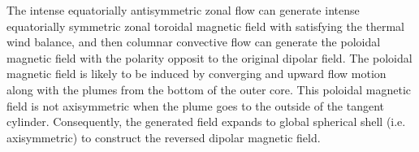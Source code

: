 {The intense equatorially antisymmetric zonal flow can generate intense equatorially symmetric zonal toroidal magnetic field with satisfying the thermal wind balance, and then columnar convective flow can generate the poloidal magnetic field with the polarity opposit to the original dipolar field.
The poloidal magnetic field is likely to be induced by converging and upward flow motion along with the plumes from the bottom of the outer core.
This poloidal magnetic field is not axisymmetric when the plume goes to the outside of the tangent cylinder. 
Consequently, the generated field expands to global spherical shell (i.e. axisymmetric) to construct the reversed dipolar magnetic field.
}
%
%
%
